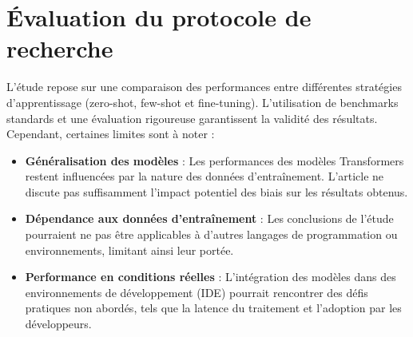 \chapter{Évaluation du protocole de recherche}




L’étude repose sur une comparaison des performances entre différentes stratégies
d’apprentissage (zero-shot, few-shot et fine-tuning). L’utilisation de
benchmarks standards et une évaluation rigoureuse garantissent la validité des
résultats. Cependant, certaines limites sont à noter :



\begin{itemize}

 \item \textbf{Généralisation
     des modèles} : Les performances des modèles Transformers
     restent influencées par la nature des données d’entraînement. L’article ne
     discute pas suffisamment l’impact potentiel des biais sur les résultats
     obtenus.

 \item \textbf{Dépendance
     aux données d'entraînement} : Les conclusions de l’étude pourraient ne pas
     être applicables à d’autres langages de programmation ou environnements,
     limitant ainsi leur portée.

 \item \textbf{Performance
     en conditions réelles} : L’intégration des modèles dans des
     environnements de développement (IDE) pourrait rencontrer des défis
     pratiques non abordés, tels que la latence du traitement et l’adoption par
     les développeurs.

\end{itemize}



